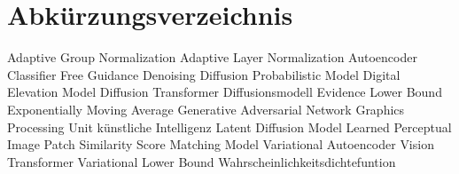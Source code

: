 \chapter*{Abkürzungsverzeichnis}

\begin{acronym}[AdaGN]
        {Adaptive Group Normalization}
        {Adaptive Layer Normalization}
           {Autoencoder}
          {Classifier Free Guidance}
         {Denoising Diffusion Probabilistic Model}
          {Digital Elevation Model}
          {Diffusion Transformer}
           {Diffusionsmodell}
         {Evidence Lower Bound}
          {Exponentially Moving Average}
          {Generative Adversarial Network}
          {Graphics Processing Unit}
           {künstliche Intelligenz}
          {Latent Diffusion Model}
        {Learned Perceptual Image Patch Similarity}
          {Score Matching Model}
          {Variational Autoencoder}
          {Vision Transformer}
          {Variational Lower Bound}
          {Wahrscheinlichkeitsdichtefuntion}
\end{acronym}